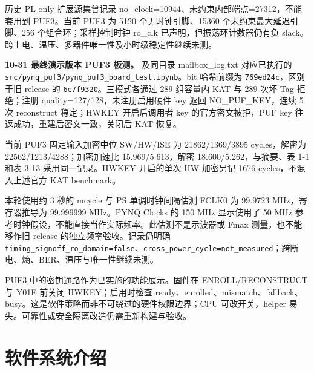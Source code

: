 历史 PL-only 扩展源集曾记录 no\_clock=10944、未约束内部端点=27312，不能套用到 PUF3。当前 PUF3 为 5120 个无时钟引脚、15360 个未约束最大延迟引脚、256 个组合环；采样控制时钟 ro\_clk 已声明，但振荡环计数器仍有负 slack。跨上电、温压、多器件唯一性及小时级稳定性继续未测。

\textbf{10-31 最终演示版本 PUF3 板测。}
\pufresult 及同目录 mailbox\_log.txt 对应已执行的 \texttt{src/\allowbreak{}pynq\_puf3/\allowbreak{}pynq\_puf3\_board\_test.ipynb}。bit 哈希前缀为 \texttt{769ed24c}，区别于旧 release 的 \texttt{6e7f9320}。三模式各通过 289 组容量内 KAT 与 289 次坏 Tag 拒绝；注册 quality=127/128，未注册启用硬件 key 返回 NO\_PUF\_KEY，连续 5 次 reconstruct 稳定；HWKEY 开启后调用者 key 的官方密文被拒，PUF key 往返成功，重建后密文一致，关闭后 KAT 恢复。

当前 PUF3 固定输入加密中位 SW/HW/ISE 为 21862/1369/3895 cycles，解密为 22562/1213/4288；加密加速比 15.969/5.613，解密 18.600/5.262，与摘要、表 1-1 和表 3-13 采用同一记录。HWKEY 开启的单次 HW 加密另记 1676 cycles，不混入上述官方 KAT benchmark。

本轮使用约 3 秒的 mcycle 与 PS 单调时钟间隔估测 FCLK0 为 99.9723 MHz，寄存器推导为 99.999999 MHz。PYNQ Clocks 的 150 MHz 显示使用了 50 MHz 参考时钟假设，不能直接当作实际频率。此估测不是示波器或 Fmax 测量，也不能移作旧 release 的独立频率验收。记录仍明确 \texttt{timing\_signoff\_ro\_domain=false}、\texttt{cross\_power\_cycle=not\_measured}；跨断电、熵、BER、温压与唯一性继续未测。

PUF3 中的密钥通路作为已实施的功能展示。固件在 ENROLL/RECONSTRUCT 与 Y01E 前关闭 HWKEY；启用时检查 ready、enrolled、mismatch、fallback、busy。这是软件策略而非不可绕过的硬件权限边界；CPU 可改开关，helper 易失。可靠性或安全隔离改造仍需重新构建与验收。


\Needspace{85pt}

\section{软件系统介绍}

